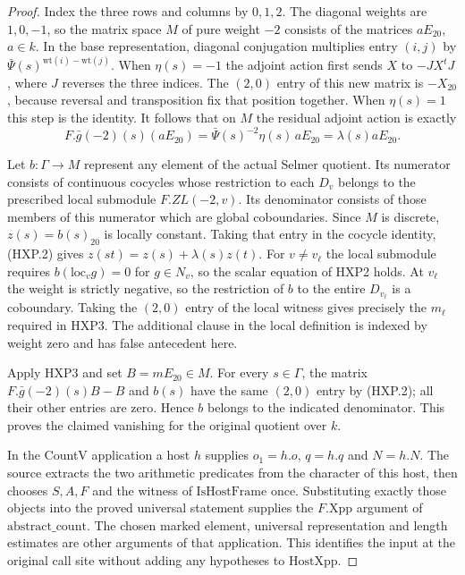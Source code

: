 \begin{proof}
Index the three rows and columns by $0,1,2$. The diagonal weights
are $1,0,-1$, so the matrix space $M$ of pure weight $-2$ consists
of the matrices $aE_{20}$, $a\in k$. In the base representation,
diagonal conjugation multiplies entry $(i,j)$ by
$\bar\Psi(s)^{\mathrm{wt}(i)-\mathrm{wt}(j)}$. When
$\eta(s)=-1$ the adjoint action first sends $X$ to $-JX^tJ$,
where $J$ reverses the three indices. The $(2,0)$ entry of this
new matrix is $-X_{20}$, because reversal and transposition fix
that position together. When $\eta(s)=1$ this step is the identity.
It follows that on $M$ the residual adjoint action is exactly
\[
    F.\bar g(-2)(s)(aE_{20})
              =\bar\Psi(s)^{-2}\eta(s)\,aE_{20}=\lambda(s)aE_{20}.
                                                               \tag{HXP.2}
\]

Let $b:\Gamma\to M$ represent any element of the actual Selmer
quotient. Its numerator consists of continuous cocycles whose
restriction to each $D_v$ belongs to the prescribed local submodule
$F.ZL(-2,v)$. Its denominator consists of those members of this
numerator which are global coboundaries. Since $M$ is discrete,
$z(s)=b(s)_{20}$ is locally constant. Taking that entry in the
cocycle identity, (HXP.2) gives
$z(st)=z(s)+\lambda(s)z(t)$. For $v\ne v_\ell$ the local submodule
requires $b(\mathrm{loc}_v g)=0$ for $g\in N_v$, so the scalar
equation of HXP2 holds. At $v_\ell$ the weight is strictly negative,
so the restriction of $b$ to the entire $D_{v_\ell}$ is a
coboundary. Taking the $(2,0)$ entry of the local witness gives
precisely the $m_\ell$ required in HXP3. The additional clause
in the local definition is indexed by weight zero and has false
antecedent here.

Apply HXP3 and set $B=mE_{20}\in M$. For every $s\in\Gamma$,
the matrix $F.\bar g(-2)(s)B-B$ and $b(s)$ have the same $(2,0)$
entry by (HXP.2); all their other entries are zero.
Hence $b$ belongs to the indicated denominator. This proves the
claimed vanishing for the original quotient over $k$.

In the CountV application a host $h$ supplies $o_1=h.o$, $q=h.q$
and $N=h.N$. The source extracts the two arithmetic predicates from
the character of this host, then chooses $S,A,F$ and the witness
of $\mathrm{IsHostFrame}$ once. Substituting exactly those objects
into the proved universal statement supplies the $F.\mathrm{Xpp}$
argument of $\mathrm{abstract\_count}$. The chosen marked element,
universal representation and length estimates are other arguments of
that application. This identifies the input at the original call site
without adding any hypotheses to $\mathrm{HostXpp}$.
\end{proof}
